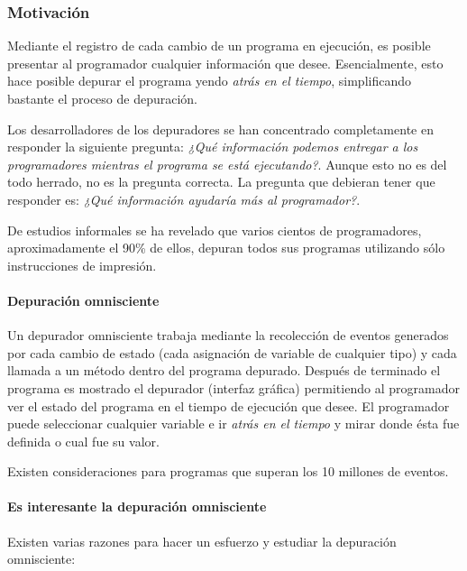 \documentclass[12pt,a4paper]{report}
\begin{document}
			\subsubsection{Motivación}

Mediante el registro de cada cambio de un programa en ejecución, es posible presentar al programador cualquier información que desee.  Esencialmente, esto hace posible depurar el programa yendo \textit{atrás en el tiempo}, simplificando bastante el proceso de depuración.


Los desarrolladores de los depuradores se han concentrado completamente en responder la siguiente pregunta: \textit{¿Qué información podemos entregar a los programadores mientras el programa se está ejecutando?}.  Aunque esto no es del todo herrado, no es la pregunta correcta.  La pregunta que debieran tener que responder es: \textit{¿Qué información ayudaría más al programador?}.

De estudios informales se ha revelado que varios cientos de programadores, aproximadamente el 90\% de ellos, depuran todos sus programas utilizando sólo instrucciones de impresión.


			\paragraph{Depuración omnisciente}

Un depurador omnisciente trabaja mediante la recolección de eventos generados por cada cambio de estado (cada asignación de variable de cualquier tipo) y cada llamada a un método dentro del programa depurado.  Después de terminado el programa es mostrado el depurador (interfaz gráfica) permitiendo al programador ver el estado del programa en el tiempo de ejecución que desee.  El programador puede seleccionar cualquier variable e ir \textit{atrás en el tiempo} y mirar donde ésta fue definida o cual fue su valor.

Existen consideraciones para programas que superan los 10 millones de eventos.


			\paragraph[Estudio interesante]{Es interesante la depuración omnisciente}

Existen varias razones para hacer un esfuerzo y estudiar la depuración omnisciente:
\end{document}
